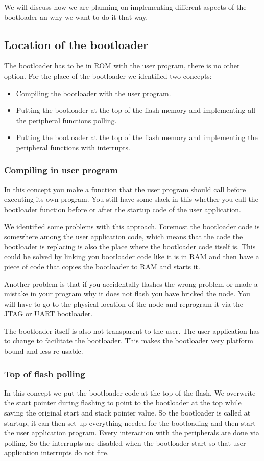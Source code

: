 \documentclass[twocolumn]{article}
\begin{document}
		We will discuss how we are planning on implementing different aspects of the bootloader an why we want to do it that way.
	
	\subsection*{Location of the bootloader}
		The bootloader has to be in ROM with the user program, there is no other option.
		For the place of the bootloader we identified two concepts:
		\begin{itemize}
			\item Compiling the bootloader with the user program.
			\item Putting the bootloader at the top of the flash memory and implementing all the peripheral functions polling.
			\item Putting the bootloader at the top of the flash memory and implementing the peripheral functions with interrupts.
		\end{itemize}
		
		\subsubsection*{Compiling in user program}
			In this concept you make a function that the user program should call before executing its own program.
			You still have some slack in this whether you call the bootloader function before or after the startup code of the user application.
			
			We identified some problems with this approach.
			Foremost the bootloader code is somewhere among the user application code,
			which means that the code the bootloader is replacing is also the place where the bootloader code itself is.
			This could be solved by linking you bootloader code like it is in RAM and then have a piece of code that copies the bootloader to RAM and starts it.
			
			Another problem is that if you accidentally flashes the wrong problem or made a mistake in your program why it does not flash you have bricked the node.
			You will have to go to the physical location of the node and reprogram it via the JTAG or UART bootloader.
			
			The bootloader itself is also not transparent to the user.
			The user application has to change to facilitate the bootloader.
			This makes the bootloader very platform bound and less re-usable.
		
		\subsubsection*{Top of flash polling}
			In this concept we put the bootloader code at the top of the flash.
			We overwrite the start pointer during flashing to point to the bootloader at the top while saving the original start and stack pointer value.
			So the bootloader is called at startup,
			it can then set up everything needed for the bootloading and then start the user application program.
			Every interaction with the peripherals are done via polling.
			So the interrupts are disabled when the bootloader start so that user application interrupts do not fire.
			
\end{document}
